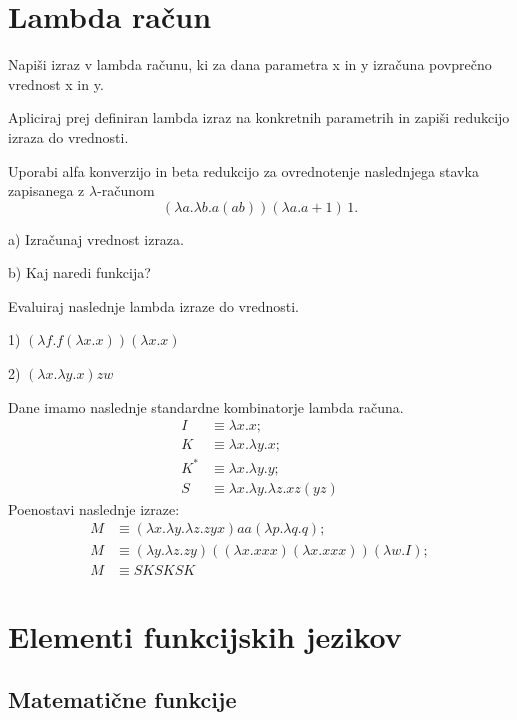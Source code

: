 \chapter{Lambda ra\v cun}

\begin{ex}
Napi\v si izraz v lambda ra\v cunu, ki za dana parametra x in y izra\v cuna povpre\v cno vrednost x in y.

Apliciraj prej definiran lambda izraz na konkretnih parametrih in zapi\v si redukcijo izraza do vrednosti.
\end{ex}
\begin{ex}
Uporabi alfa konverzijo in beta redukcijo za ovrednotenje naslednjega stavka zapisanega z $\lambda$-ra\v cunom
$$(\lambda a.\lambda b.a (a b)) (\lambda a.a + 1)\,1.$$

a) Izra\v cunaj vrednost izraza.

b) Kaj naredi funkcija?

\end{ex}
\begin{ex}
Evaluiraj naslednje lambda izraze do vrednosti.

1) $( \lambda f.f( \lambda x.x))( \lambda x.x) $

2) $( \lambda x. \lambda y.x) z w$

\end{ex}
\begin{ex}
Dane imamo naslednje standardne kombinatorje lambda ra\v cuna.
\begin{align*}
I& \equiv \lambda x.x;\\
K& \equiv \lambda x.\lambda y.x;\\
K^*& \equiv \lambda x.\lambda y.y;\\
S& \equiv \lambda x. \lambda y.\lambda z.xz(yz)
\end{align*}
Poenostavi naslednje izraze:
\begin{align*}
M &\equiv (\lambda x.\lambda y.\lambda z.zyx)aa(\lambda p.\lambda q.q);\\
M &\equiv (\lambda y.\lambda z.zy)((\lambda x.xxx)(\lambda x.xxx))(\lambda w.I);\\
M &\equiv SKSKSK
\end{align*}
\end{ex}

\chapter{Elementi funkcijskih jezikov}

\section{Matemati\v cne funkcije}

